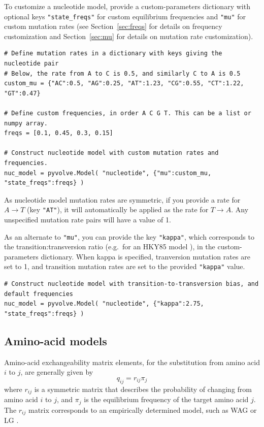 \documentclass{article}
\newcommand{\code}[1]{\texttt{\small{#1}}}
\begin{document}
To customize a nucleotide model, provide a custom-parameters dictionary with optional keys \code{"state\_freqs"} for custom equilibrium frequencies and \code{"mu"} for custom mutation rates (see Section~\ref{sec:freqs} for details on frequency customization and Section~\ref{sec:mu} for details on mutation rate customization).
\begin{lstlisting}
# Define mutation rates in a dictionary with keys giving the nucleotide pair
# Below, the rate from A to C is 0.5, and similarly C to A is 0.5
custom_mu = {"AC":0.5, "AG":0.25, "AT":1.23, "CG":0.55, "CT":1.22, "GT":0.47}

# Define custom frequencies, in order A C G T. This can be a list or numpy array.
freqs = [0.1, 0.45, 0.3, 0.15]

# Construct nucleotide model with custom mutation rates and frequencies.
nuc_model = pyvolve.Model( "nucleotide", {"mu":custom_mu, "state_freqs":freqs} )
\end{lstlisting}

As nucleotide model mutation rates are symmetric, if you provide a rate for $A \rightarrow T$ (key \code{"AT"}), it will automatically be applied as the rate for $T \rightarrow A$. Any unspecified mutation rate pairs will have a value of 1.

As an alternate to \code{"mu"}, you can provide the key \code{"kappa"}, which corresponds to the transition:transversion ratio (e.g.\ for an HKY85  model \citep{HKY85}), in the custom-parameters dictionary. When kappa is specified, tranversion mutation rates are set to 1, and transition mutation rates are set to the provided \code{"kappa"} value.

\begin{lstlisting}
# Construct nucleotide model with transition-to-transversion bias, and default frequencies
nuc_model = pyvolve.Model( "nucleotide", {"kappa":2.75, "state_freqs":freqs} )
\end{lstlisting}


\subsection{Amino-acid models}\label{sec:amino_basic}

Amino-acid exchangeability matrix elements, for the substitution from amino acid $i$ to $j$, are generally given by
\begin{equation}
q_{ij} = r_{ij} \pi_j
\end{equation}
where $r_{ij}$ is a symmetric matrix that describes the probability of changing from amino acid $i$ to $j$, and $\pi_j$ is the equilibrium frequency of the target amino acid $j$. The $r_{ij}$ matrix corresponds to an empirically determined model, such as WAG \citep{WAG} or LG \citep{LG}.
\end{document}
